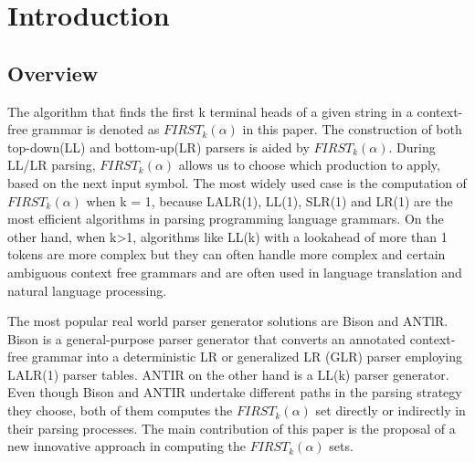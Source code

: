 \documentclass{sig-alternate-05-2015}
\begin{document}


%
%

%
%
\printccsdesc



\section{Introduction}
\subsection{Overview}
The algorithm that finds the first k terminal heads of a given string in a context-free grammar is denoted as $FIRST_k(\alpha)$ in this paper. 
The construction of both top-down(LL) and bottom-up(LR) parsers is aided by $FIRST_k(\alpha)$. 
During LL/LR parsing, $FIRST_k(\alpha)$ allows us to choose which production to apply, based on the next input symbol.
The most widely used case is the computation of $FIRST_k(\alpha)$ when k = 1, because LALR(1), LL(1), SLR(1) and LR(1) are the most efficient algorithms in parsing programming language grammars. 
On the other hand, when k>1, algorithms like LL(k) with a lookahead of more than 1 tokens are more complex but they can often handle more complex and certain ambiguous context free grammars and 
are often used in language translation and natural language processing. 

The most popular real world parser generator solutions are Bison and ANTlR. 
Bison is a general-purpose parser generator that converts an annotated context-free grammar into a deterministic LR or generalized LR (GLR) parser employing LALR(1) parser tables\cite{johnson79yacc,donnelly03bison, gnu:bison}. 
ANTIR on the other hand is a LL(k) parser generator\cite{parr93ll,antlr}.
Even though Bison and ANTIR undertake different paths in the parsing strategy they choose, both of them computes the $FIRST_k(\alpha)$ set directly or indirectly in their parsing processes.
The main contribution of this paper is the proposal of a new innovative approach in computing the $FIRST_k(\alpha)$ sets.
\end{document}
